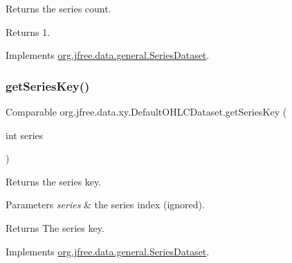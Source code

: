 Returns the series count.

\begin{DoxyReturn}{Returns}
1. 
\end{DoxyReturn}


Implements \mbox{\hyperlink{interfaceorg_1_1jfree_1_1data_1_1general_1_1_series_dataset_a84fe822f5918f941d9de1ed1b73c9f58}{org.\+jfree.\+data.\+general.\+Series\+Dataset}}.

\mbox{\label{classorg_1_1jfree_1_1data_1_1xy_1_1_default_o_h_l_c_dataset_a375f8aeeebf0b8b7fb7f4c7f5c60fb55}} 
\subsubsection{\texorpdfstring{get\+Series\+Key()}{getSeriesKey()}}
{\footnotesize\ttfamily Comparable org.\+jfree.\+data.\+xy.\+Default\+O\+H\+L\+C\+Dataset.\+get\+Series\+Key (\begin{DoxyParamCaption}\item[{int}]{series }\end{DoxyParamCaption})}

Returns the series key.


\begin{DoxyParams}{Parameters}
{\em series} & the series index (ignored).\\
\hline
\end{DoxyParams}
\begin{DoxyReturn}{Returns}
The series key. 
\end{DoxyReturn}


Implements \mbox{\hyperlink{interfaceorg_1_1jfree_1_1data_1_1general_1_1_series_dataset_a60488892b2314a05a012999e26a74178}{org.\+jfree.\+data.\+general.\+Series\+Dataset}}.

\mbox{\label{classorg_1_1jfree_1_1data_1_1xy_1_1_default_o_h_l_c_dataset_a83b83f0c9bfd31b3b26adc04760cc910}} 
